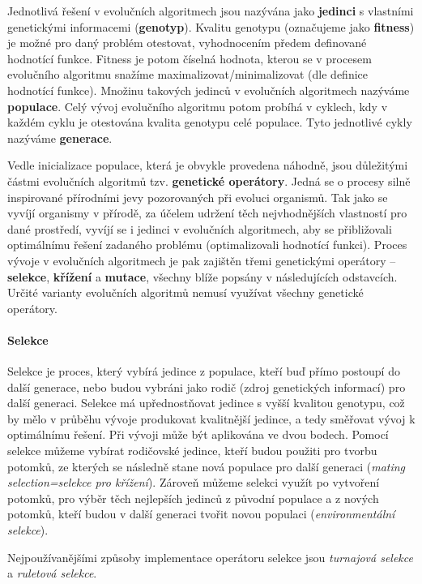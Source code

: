 Jednotlivá řešení v evolučních algoritmech jsou nazývána jako \textbf{jedinci}
s vlastními genetickými informacemi (\textbf{genotyp}). Kvalitu genotypu
(označujeme jako \textbf{fitness}) je možné pro daný problém otestovat,
vyhodnocením předem definované hodnotící funkce. Fitness je potom číselná
hodnota, kterou se v procesem evolučního algoritmu snažíme
maximalizovat/minimalizovat (dle definice hodnotící funkce). Množinu takových
jedinců v evolučních algoritmech nazýváme \textbf{populace}. Celý vývoj
evolučního algoritmu potom probíhá v cyklech, kdy v každém cyklu je otestována
kvalita genotypu celé populace. Tyto jednotlivé cykly nazýváme
\textbf{generace}.

Vedle inicializace populace, která je obvykle provedena náhodně, jsou
důležitými částmi evolučních algoritmů tzv. \textbf{genetické operátory}. Jedná
se o procesy silně inspirované přírodními jevy pozorovaných při evoluci
organismů. Tak jako se vyvíjí organismy v přírodě, za účelem udržení těch
nejvhodnějších vlastností pro dané prostředí, vyvíjí se i jedinci v evolučních
algoritmech, aby se přibližovali optimálnímu řešení zadaného problému
(optimalizovali hodnotící funkci). Proces vývoje v evolučních algoritmech je
pak zajištěn třemi genetickými operátory -- \textbf{selekce}, \textbf{křížení}
a \textbf{mutace}, všechny blíže popsány v následujících odstavcích. Určité
varianty evolučních algoritmů nemusí využívat všechny genetické operátory.

\paragraph{Selekce}
Selekce je proces, který vybírá jedince z populace, kteří buď přímo postoupí do
další generace, nebo budou vybráni jako rodič (zdroj genetických informací) pro
další generaci. Selekce má upřednostňovat jedince s vyšší kvalitou genotypu,
což by mělo v průběhu vývoje produkovat kvalitnější jedince, a tedy směřovat
vývoj k optimálnímu řešení. Při vývoji může být aplikována ve dvou bodech.
Pomocí selekce můžeme vybírat rodičovské jedince, kteří budou použiti pro
tvorbu potomků, ze kterých se následně stane nová populace pro další generaci
(\emph{mating selection=selekce pro křížení}). Zároveň můžeme selekci využít po
vytvoření potomků, pro výběr těch nejlepších jedinců z původní populace a z
nových potomků, kteří budou v další generaci tvořit novou populaci
(\emph{environmentální selekce}).

Nejpoužívanějšími způsoby implementace operátoru selekce jsou \emph{turnajová
selekce} a \emph{ruletová selekce}. 

